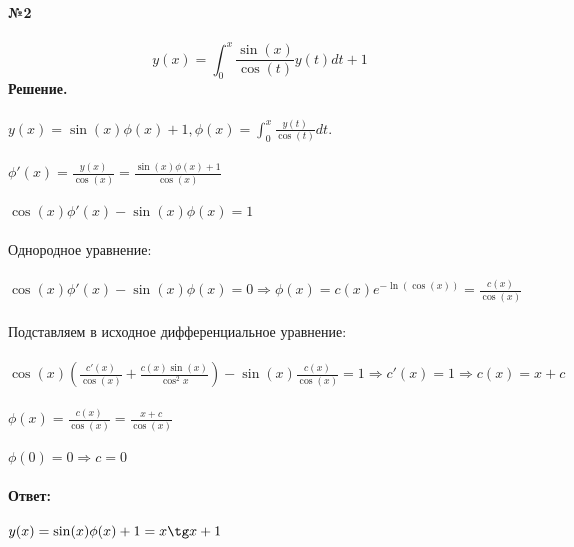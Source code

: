 \documentclass[10pt,a4paper]{article}
\begin{document}
	\noindent\textbf{№2} \\  \\
	$$y(x) = \int_{0}^{x}\frac{\sin(x)}{\cos(t)}y(t)dt + 1$$ 
	\textbf{Решение.} \\ \\
	$y(x) = \sin(x)\phi(x) + 1, \phi(x) = \int_{0}^{x}\frac{y(t)}{\cos(t)}dt.$ \\  \\
	$\phi'(x) = \frac{y(x)}{\cos(x)} = \frac{\sin(x)\phi(x) + 1}{\cos(x)}$ \\ \\
	$\cos(x)\phi'(x) - \sin(x)\phi(x) = 1$ \\ \\ 
	Однородное уравнение: \\ \\
	$\cos(x)\phi'(x) - \sin(x)\phi(x) = 0 \Rightarrow \phi(x) = c(x)e^{-\ln(\cos(x))} = \frac{c(x)}{\cos(x)} $\\ \\ 
	Подставляем в исходное дифференциальное уравнение: \\ \\
	$\cos(x)\left(\frac{c'(x)}{\cos(x)} + \frac{c(x)\sin(x)}{\cos^2 x}\right) - \sin(x)\frac{c(x)}{\cos(x)} = 1 \Rightarrow c'(x) = 1 \Rightarrow c(x) = x +c $ \\ \\
	$\phi(x) = \frac{c(x)}{\cos(x)} = \frac{x + c}{\cos(x)}$ \\ \\
	$\phi(0) = 0 \Rightarrow c = 0$ \\ \\
	\textbf{Ответ:} \\ \\
	$y(x) = \sin(x)\phi(x) + 1 = x\tg x + 1$ \\ \\
	
\end{document}
